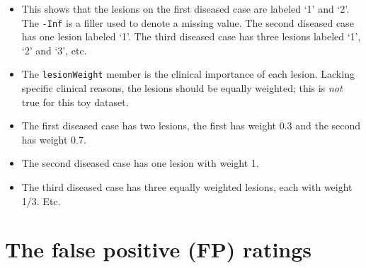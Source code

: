 \documentclass[
]{book}
\newenvironment{Shaded}{\begin{snugshade}}{\end{snugshade}}
\newcommand{\CommentTok}[1]{\textcolor[rgb]{0.56,0.35,0.01}{\textit{#1}}}
\newcommand{\NormalTok}[1]{#1}
\newcommand{\OperatorTok}[1]{\textcolor[rgb]{0.81,0.36,0.00}{\textbf{#1}}}
\providecommand{\tightlist}{%
  \setlength{\itemsep}{0pt}\setlength{\parskip}{0pt}}
\begin{document}
\begin{Shaded}
\end{Shaded}

\begin{itemize}
\tightlist
\item
  This shows that the lesions on the first diseased case are labeled `1' and `2'. The \texttt{-Inf} is a filler used to denote a missing value. The second diseased case has one lesion labeled `1'. The third diseased case has three lesions labeled `1', `2' and `3', etc.
\item
  The \texttt{lesionWeight} member is the clinical importance of each lesion. Lacking specific clinical reasons, the lesions should be equally weighted; this is \emph{not} true for this toy dataset.
\end{itemize}

\begin{Shaded}
\end{Shaded}

\begin{itemize}
\tightlist
\item
  The first diseased case has two lesions, the first has weight 0.3 and the second has weight 0.7.
\item
  The second diseased case has one lesion with weight 1.
\item
  The third diseased case has three equally weighted lesions, each with weight 1/3. Etc.
\end{itemize}

\hypertarget{quick-start-froc-data-fp}{%
\section{The false positive (FP) ratings}\label{quick-start-froc-data-fp}}
\end{document}
